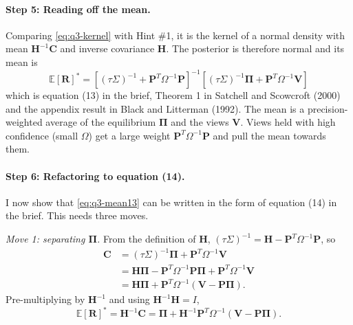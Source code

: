 \documentclass[11pt]{article}
\numberwithin{equation}{section}
\begin{document}
\paragraph{Step 5: Reading off the mean.}
Comparing \eqref{eq:q3-kernel} with Hint \#1, it is the kernel of a normal density with mean $\bm{H}^{-1}\bm{C}$ and inverse covariance $\bm{H}$. The posterior is therefore normal and its mean is
\begin{equation}
  \boxed{\;\mathbb{E}[\bm{R}]^{*} = \left[(\tau\Sigma)^{-1} + \bm{P}^{T}\Omega^{-1}\bm{P}\right]^{-1}\left[(\tau\Sigma)^{-1}\bm{\Pi} + \bm{P}^{T}\Omega^{-1}\bm{V}\right]\;}
  \label{eq:q3-mean13}
\end{equation}
which is equation (13) in the brief, Theorem 1 in Satchell and Scowcroft (2000) and the appendix result in Black and Litterman (1992). The mean is a precision-weighted average of the equilibrium $\bm{\Pi}$ and the views $\bm{V}$. Views held with high confidence (small $\Omega$) get a large weight $\bm{P}^{T}\Omega^{-1}\bm{P}$ and pull the mean towards them.

\paragraph{Step 6: Refactoring to equation (14).}
I now show that \eqref{eq:q3-mean13} can be written in the form of equation (14) in the brief. This needs three moves.

\textit{Move 1: separating $\bm{\Pi}$.} From the definition of $\bm{H}$, $(\tau\Sigma)^{-1} = \bm{H} - \bm{P}^{T}\Omega^{-1}\bm{P}$, so
\begin{align*}
  \bm{C} &= (\tau\Sigma)^{-1}\bm{\Pi} + \bm{P}^{T}\Omega^{-1}\bm{V} \\
  &= \bm{H}\bm{\Pi} - \bm{P}^{T}\Omega^{-1}\bm{P}\bm{\Pi} + \bm{P}^{T}\Omega^{-1}\bm{V} \\
  &= \bm{H}\bm{\Pi} + \bm{P}^{T}\Omega^{-1}\left(\bm{V} - \bm{P}\bm{\Pi}\right).
\end{align*}
Pre-multiplying by $\bm{H}^{-1}$ and using $\bm{H}^{-1}\bm{H} = I$,
\begin{equation}
  \mathbb{E}[\bm{R}]^{*} = \bm{H}^{-1}\bm{C} = \bm{\Pi} + \bm{H}^{-1}\bm{P}^{T}\Omega^{-1}\left(\bm{V} - \bm{P}\bm{\Pi}\right).
  \label{eq:q3-move1}
\end{equation}
\end{document}
